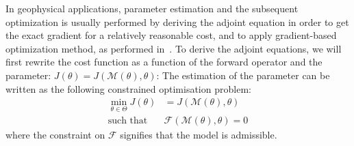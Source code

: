 \documentclass[../../Main_ManuscritThese.tex]{subfiles}
\begin{document}
In geophysical applications, parameter estimation and the subsequent optimization is usually performed by deriving the adjoint equation in order to get the exact gradient for a relatively reasonable cost, and to apply gradient-based optimization method, as performed in~\cite{das_estimation_1991,das_variational_1992,honnorat_identification_2010,couderc_dassfow-shallow_2013}.
To derive the adjoint equations, we will first rewrite the cost function as a function of the forward operator and the parameter: $J(\theta) = J(\mathcal{M}(\theta),\theta)$:
The estimation of the parameter can be written as the following constrained optimisation problem:
\begin{equation}
  \begin{aligned}
  \min_{\theta \in \Theta} J(\theta) &= J(\mathcal{M}(\theta), \theta) \label{eq:def_J_adjoint} \\
  \text{such that } &\mathcal{F}(\mathcal{M}(\theta), \theta) = 0 %
  \end{aligned}
\end{equation}
where the constraint on $\mathcal{F}$ signifies that the model is admissible.
\end{document}
